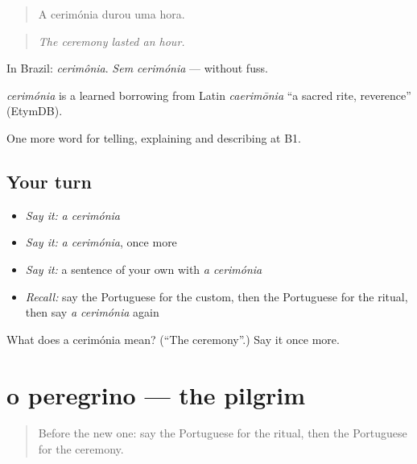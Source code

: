 \begin{quote}
A cerimónia durou uma hora.
\end{quote}

\begin{quote}
\emph{The ceremony lasted an hour.}
\end{quote}

In Brazil: \emph{cerimônia}. \emph{Sem cerimónia} — without fuss.

\begin{cousinweb}
\emph{cerimónia} is a learned borrowing from Latin \emph{caerimōnia} \textquotedblleft{}a sacred rite, reverence\textquotedblright{} (EtymDB).
\end{cousinweb}

\begin{grammarlens}[title={What you've built}]
One more word for telling, explaining and describing at B1.
\end{grammarlens}

\subsection*{Your turn}
\begin{itemize}
\raggedright
  \item \emph{Say it:} \emph{a cerimónia}
  \item \emph{Say it:} \emph{a cerimónia}, once more
  \item \emph{Say it:} a sentence of your own with \emph{a cerimónia}
  \item \emph{Recall:} say the Portuguese for the custom, then the Portuguese for the ritual, then say \emph{a cerimónia} again
\end{itemize}

\begin{tcolorbox}[breakable,colback=teal!4,colframe=teal!35!black,title={Before you move on}]
What does a cerimónia mean? (\textquotedblleft{}The ceremony\textquotedblright{}.) Say it once more.
\end{tcolorbox}
\section[o peregrino]{o peregrino — the pilgrim}

\label{lesson:PT-C320-peregrino}



\begin{quote}
Before the new one: say the Portuguese for the ritual, then the Portuguese for the ceremony.
\end{quote}

